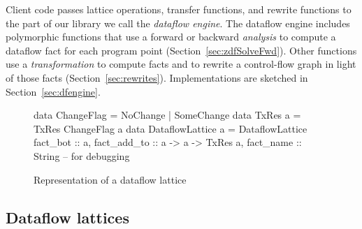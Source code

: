 \documentclass[blockstyle,preprint,natbib,nocopyrightspace]{sigplanconf}
\newcommand{\authornote}[1]{{\em #1}}
\def\authornote#1{\unskip\relax}
\newcommand{\simon}[1]{\authornote{SLPJ: #1}}
\newcommand\secref[1]{Section~\ref{sec:#1}}
\newcommand\figlabel[1]{\label{fig:#1}}
\begin{document}
Client code passes
lattice
operations, transfer functions, and rewrite functions
to the part of our library we call the \emph{dataflow engine}.
The dataflow engine includes
polymorphic functions
that use a forward or backward \emph{analysis} to compute 
a dataflow fact for each program point (\secref{zdfSolveFwd}).
Other functions
use a \emph{transformation} to compute facts and to
rewrite a control-flow graph in light of those facts
(\secref{rewrites}).
Implementations are sketched in \secref{dfengine}.
\simon{Interface?  Perhpas ``The signatures and expected usage of these
functions is described in xxx, while their implementation is sketched
in yyy''.  NR: I like the idea of parallel structure, but the paper is
not really very parallel here.  Faced with either repeating the
section references or distorting what those sections are about, I've
chosen instead to abandon parallel structure.}


\begin{figure}
\begin{code}
data ChangeFlag = NoChange | SomeChange
data TxRes a    = TxRes ChangeFlag a
data DataflowLattice a = DataflowLattice
 {fact_bot        :: a,
  fact_add_to     :: a -> a -> TxRes a,
  fact_name       :: String } -- for debugging
\end{code}
\caption{Representation of a dataflow lattice} \figlabel{lattice-type} \figlabel{lattice}
\end{figure}


\subsection{Dataflow lattices}
\end{document}
